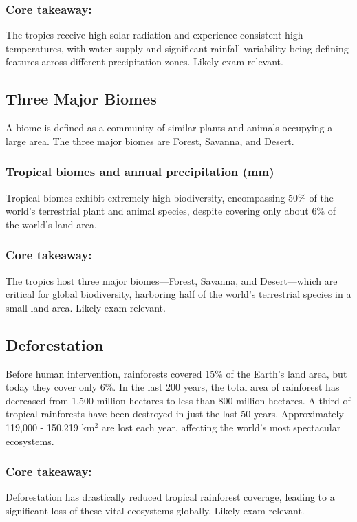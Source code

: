 \subsubsection*{Core takeaway:} 
The tropics receive high solar radiation and experience consistent high temperatures, with water supply and significant rainfall variability being defining features across different precipitation zones. Likely exam-relevant.


\subsection{Three Major Biomes} 
A biome is defined as a community of similar plants and animals occupying a large area. The three major biomes are Forest, Savanna, and Desert. 

\subsubsection*{Tropical biomes and annual precipitation (mm)} Tropical biomes exhibit extremely high biodiversity, encompassing 50\% of the world’s terrestrial plant and animal species, despite covering only about 6\% of the world’s land area.

\subsubsection*{Core takeaway:} 
The tropics host three major biomes—Forest, Savanna, and Desert—which are critical for global biodiversity, harboring half of the world's terrestrial species in a small land area. Likely exam-relevant.


\subsection{Deforestation} 
Before human intervention, rainforests covered 15\% of the Earth's land area, but today they cover only 6\%. In the last 200 years, the total area of rainforest has decreased from 1,500 million hectares to less than 800 million hectares. A third of tropical rainforests have been destroyed in just the last 50 years. Approximately 119,000 - 150,219 km$^2$ are lost each year, affecting the world's most spectacular ecosystems.

\subsubsection*{Core takeaway: }
Deforestation has drastically reduced tropical rainforest coverage, leading to a significant loss of these vital ecosystems globally. Likely exam-relevant.


